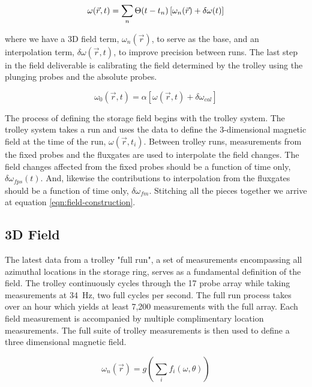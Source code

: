 \begin{equation}
\label{eqn:field-construction}
\omega(\vec{r}, t) = \sum_n \Theta(t - t_n) \\
\left[\omega_{n}(\vec{r}) + \delta \omega(t) \right]
\end{equation}

\noindent
where we have a 3D field term, $\omega_{n}(\vec{r})$, to serve as the base, and an interpolation term, $\delta \omega(\vec{r}, t)$, to improve precision between runs. The last step in the field deliverable is calibrating the field determined by the trolley using the plunging probes and the absolute probes.

\begin{equation}
\label{eqn:field-calibration}
\omega_0(\vec{r}, t) = \alpha [\omega(\vec{r}, t) + \delta \omega_{cal}]
\end{equation}

The process of defining the \gmtwo storage field begins with the trolley system.  The trolley system takes a run and uses the data to define the 3-dimensional magnetic field at the time of the run, $\omega(\vec{r}, t_i)$.  Between trolley runs, measurements from the fixed probes and the fluxgates are used to interpolate the field changes.  The field changes affected from the fixed probes should be a function of time only, $\delta \omega_{fps}(t)$.  And, likewise the contributions to interpolation from the fluxgates should be a function of time only, $\delta \omega_{fm}$.  Stitching all the pieces together we arrive at equation \ref{eqn:field-construction}.

\subsection{3D Field}

The latest data from a trolley "full run", a set of measurements encompassing all azimuthal locations in the storage ring, serves as a fundamental definition of the field.  The trolley continuously cycles through the 17 probe array while taking measurements at \SI{34}{\Hz}, two full cycles per second.  The full run process takes over an hour which yields at least 7,200 measurements with the full array. Each field measurement is accompanied by multiple complimentary location measurements.  The full suite of trolley measurements is then used to define a three dimensional magnetic field.

\begin{equation}
\label{eqn:field-base}
\omega_{n}(\vec{r}) = g(\sum_{i}f_i(\omega, \theta))
\end{equation}

